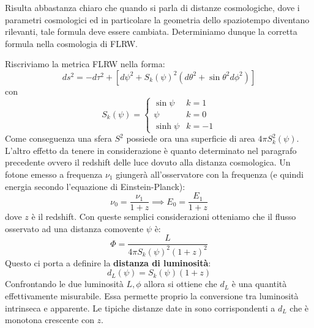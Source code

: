 Risulta abbastanza chiaro che quando si parla di distanze cosmologiche, dove i parametri cosmologici ed in particolare la geometria dello spaziotempo diventano rilevanti, tale formula deve essere cambiata. Determiniamo dunque la corretta formula nella cosmologia di FLRW.

Riscriviamo la metrica FLRW nella forma:
\begin{equation}
    ds^2 = -d\tau^2 +\left[ d\psi^2 + S_k(\psi)^2(d\theta^2 + \sin\theta^2 d\phi^2) \right]
    \label{eq.metrica_flrw_esplicitata}
\end{equation}
con
\begin{equation*}
    S_k(\psi) = \left\{ \begin{array}{cc}
        \sin\psi      & k= 1 \\
        \psi   & k= 0 \\
        \sinh\psi & k = -1 
    \end{array}\right.
\end{equation*}
Come conseguenza una sfera $S^2$ possiede ora una superficie di area $4\pi S_k^2(\psi)$. L'altro effetto da tenere in considerazione è quanto determinato nel paragrafo precedente ovvero il redshift delle luce dovuto alla distanza cosmologica. Un fotone emesso a frequenza $\nu_1$ giungerà all'osservatore con la frequenza (e quindi energia secondo l'equazione di Einstein-Planck):
\begin{equation*}
    \nu_0 = \frac{\nu_1}{1+z} \implies E_0 = \frac{E_1}{1+z}
\end{equation*}
dove $z$ è il redshift.
Con queste semplici considerazioni otteniamo che il flusso osservato ad una distanza comovente $\psi$ è:
\begin{equation}
    \Phi = \frac{L}{4\pi S_k(\psi)^2(1+z)^2}
    \label{eq.flusso_dist_cosmologica}
\end{equation}
Questo ci porta a definire la \textbf{distanza di luminosità}:
\begin{equation}
    d_L(\psi) =S_k(\psi)(1+z)
    \label{eq.luminosity_distance}
\end{equation}
Confrontando le due luminosità $L, \phi$ allora si ottiene che $d_L$ è una quantità effettivamente misurabile. Essa permette proprio la conversione tra luminosità intrinseca e apparente. Le tipiche distanze date in  sono corrispondenti a $d_L$ che è monotona crescente con $z$.



